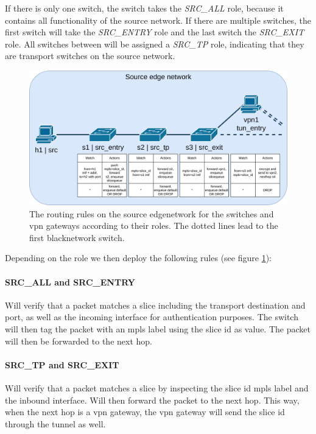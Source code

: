 If there is only one switch, the switch takes the \textit{SRC\_ALL} role, because it contains all functionality of the source network. If there are multiple switches, the first switch will take the \textit{SRC\_ENTRY} role and the last switch the \textit{SRC\_EXIT} role. All switches between will be assigned a \textit{SRC\_TP} role, indicating that they are transport switches on the source network.

\begin{figure}[ht]
    \centering
    \includegraphics[width=\linewidth]{images/chapter_6/routing_source.png}
    \caption[Routing on the source \gls{edgenetwork}]{The routing rules on the source \gls{edgenetwork} for the switches and \acrshort{vpn} gateways according to their roles. The dotted lines lead to the first \gls{blacknetwork} switch.}
    \label{fig:routing_source}
\end{figure}

Depending on the role we then deploy the following rules (see figure \ref{fig:routing_source}):

\paragraph{SRC\_ALL and SRC\_ENTRY} Will verify that a packet matches a slice including the transport destination and port, as well as the incoming interface for authentication purposes. The switch will then tag the packet with an \acrshort{mpls} label using the slice id as value. The packet will then be forwarded to the next hop.

\paragraph{SRC\_TP and SRC\_EXIT} Will verify that a packet matches a slice by inspecting the slice id \acrshort{mpls} label and the inbound interface. Will then forward the packet to the next hop. This way, when the next hop is a \acrshort{vpn} gateway, the \acrshort{vpn} gateway will send the slice id through the tunnel as well.

